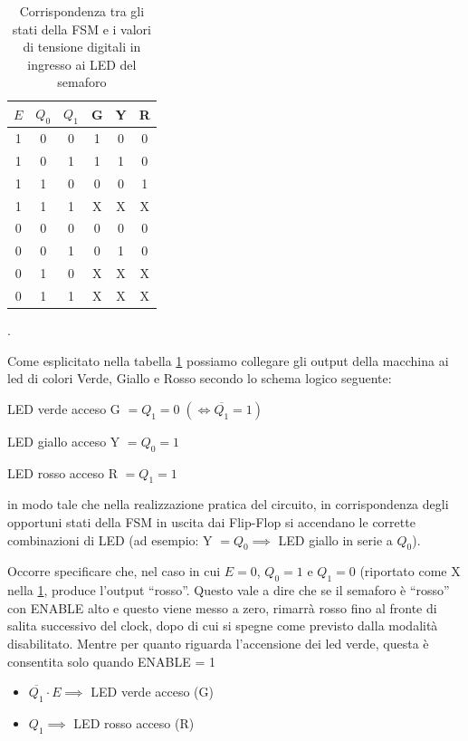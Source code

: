 \documentclass[10pt, a4paper, italian]{article}
\newcommand{\dontcare}{X}
\begin{document}
\begin{table}[htbp]
    \centering
        \begin{tabular}{c|cc|ccc}
          \toprule
          $ E $ & $ Q_0 $ & $ Q_1 $ &   G   &   Y   &   R   \\
          \midrule
          \midrule
          1   &     0     &     0     &     1     &     0     &     0     \\
          1   &     0     &     1     &     1     &     1     &     0     \\
          1   &     1     &     0     &     0     &     0     &     1     \\
          1   &     1     &     1     & \dontcare & \dontcare & \dontcare \\
          \midrule
          0   &     0     &     0     &     0     &     0     &     0     \\
          0   &     0     &     1     &     0     &     1     &     0     \\
          0   &     1     &     0     & \dontcare & \dontcare & \dontcare \\
          0   &     1     &     1     & \dontcare & \dontcare & \dontcare \\
          \bottomrule   
    \end{tabular}
    \caption{Corrispondenza tra gli stati della FSM e i valori di tensione
	digitali in ingresso ai LED del semaforo \label{tab: LED}}.     
\end{table}

Come esplicitato nella tabella \ref{tab: LED} possiamo collegare gli output
della macchina ai led di colori Verde, Giallo e Rosso secondo lo schema
logico seguente:
\begin{description}
	\item{LED verde acceso} G $= Q_1 = 0 \; (\iff \overline{Q_1} = 1)$ 
    \item{LED giallo acceso} Y $= Q_0 = 1$
    \item{LED rosso acceso} R $= Q_1 = 1$
\end{description}
in modo tale che nella realizzazione pratica del circuito, in corrispondenza
degli opportuni stati della FSM in uscita dai Flip-Flop si accendano le
corrette combinazioni di LED (ad esempio: Y $= Q_0 \implies$ LED giallo in
serie a $Q_0$).

Occorre specificare che, nel caso in cui $E = 0$, $Q_0 = 1$ e $Q_1 = 0$ (riportato
come X nella \cref{tab: LED}, produce l’output “rosso”. Questo vale a dire che se il
semaforo è “rosso” con ENABLE alto e questo viene messo a zero, rimarrà rosso
fino al fronte di salita successivo del clock, dopo di cui si spegne come
previsto dalla modalità disabilitato.
Mentre per quanto riguarda l'accensione dei led verde, questa è consentita
solo quando ENABLE = 1
\begin{itemize}
    \item $\overline{Q_1} \cdot E \implies$ LED verde acceso (G)
    \item $Q_1 \implies$ LED rosso acceso (R)
\end{itemize}
\end{document}
